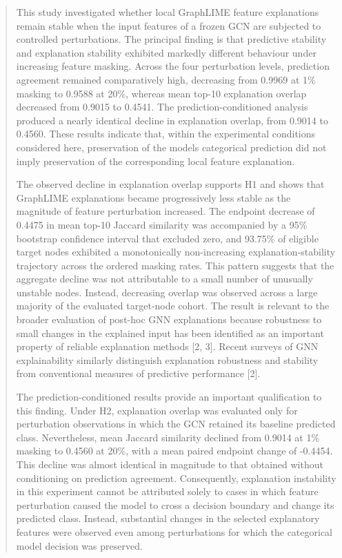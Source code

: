 \documentclass[a4paper]{article}
\begin{document}
\begin{quote}
This study investigated whether local GraphLIME feature explanations
remain stable when the input features of a frozen GCN are subjected to
controlled perturbations. The principal finding is that predictive
stability and explanation stability exhibited markedly different
behaviour under increasing feature masking. Across the four perturbation
levels, prediction agreement remained comparatively high, decreasing
from 0.9969 at 1\% masking to 0.9588 at 20\%, whereas mean top-10
explanation overlap decreased from 0.9015 to 0.4541. The
prediction-conditioned analysis produced a nearly identical decline in
explanation overlap, from 0.9014 to 0.4560. These results indicate that,
within the experimental conditions considered here, preservation of the
model\textquotesingle s categorical prediction did not imply
preservation of the corresponding local feature explanation.

The observed decline in explanation overlap supports H1 and shows that
GraphLIME explanations became progressively less stable as the magnitude
of feature perturbation increased. The endpoint decrease of 0.4475 in
mean top-10 Jaccard similarity was accompanied by a 95\% bootstrap
confidence interval that excluded zero, and 93.75\% of eligible target
nodes exhibited a monotonically non-increasing explanation-stability
trajectory across the ordered masking rates. This pattern suggests that
the aggregate decline was not attributable to a small number of
unusually unstable nodes. Instead, decreasing overlap was observed
across a large majority of the evaluated target-node cohort. The result
is relevant to the broader evaluation of post-hoc GNN explanations
because robustness to small changes in the explained input has been
identified as an important property of reliable explanation methods
{[}2, 3{]}. Recent surveys of GNN explainability similarly distinguish
explanation robustness and stability from conventional measures of
predictive performance {[}2{]}.

The prediction-conditioned results provide an important qualification to
this finding. Under H2, explanation overlap was evaluated only for
perturbation observations in which the GCN retained its baseline
predicted class. Nevertheless, mean Jaccard similarity declined from
0.9014 at 1\% masking to 0.4560 at 20\%, with a mean paired endpoint
change of -0.4454. This decline was almost identical in magnitude to
that obtained without conditioning on prediction agreement.
Consequently, explanation instability in this experiment cannot be
attributed solely to cases in which feature perturbation caused the
model to cross a decision boundary and change its predicted class.
Instead, substantial changes in the selected explanatory features were
observed even among perturbations for which the categorical model
decision was preserved.


\end{quote}
\end{document}
